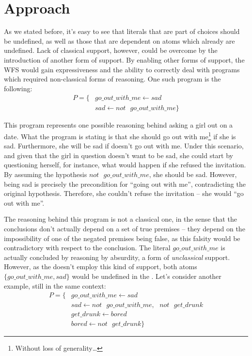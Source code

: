 \section{Approach}
As we stated before, it's easy to see that literals that are part of choices should be undefined, as well as those that are dependent on atoms which already are undefined. Lack of classical support, however, could be overcome by the introduction of another form of support. By enabling other forms of support, the WFS would gain expressiveness and the ability to correctly deal with programs which required non-classical forms of reasoning. One such program is the following:
\begin{align*}
P=\{ & go\_out\_with\_me\leftarrow sad\\
		 & sad \leftarrow not\text{ }go\_out\_with\_me\}
\end{align*}

This program represents one possible reasoning behind asking a girl out on a date. What the program is stating is that she should go out with me\footnote{Without loss of generality\ldots} if she is sad. Furthermore, she will be sad if doesn't go out with me. Under this scenario, and given that the girl in question doesn't want to be sad, she could start by questioning herself, for instance, what would happen if she refused the invitation. By assuming the hypothesis $not\text{ }go\_out\_with\_me$, she should be sad. However, being sad is precisely the precondition for ``going out with me'', contradicting the original hypothesis. Therefore, she couldn't refuse the invitation -- she would ``go out with me''.

The reasoning behind this program is not a classical one, in the sense that the conclusions don't actually depend on a set of true premises -- they depend on the impossibility of one of the negated premises being false, as this falsity would be contradictory with respect to the conclusion. The literal $go\_out\_with\_me$ is actually concluded by reasoning by absurdity, a form of \emph{unclassical} support. However, as the \wfs doesn't employ this kind of support, both atoms $\{go\_out\_with\_me, sad\}$ would be undefined in the \wfm. Let's consider another example, still in the same context:
\begin{align*}
P=\{ & go\_out\_with\_me\leftarrow sad\\
		 & sad \leftarrow not\text{ }go\_out\_with\_me,\text{ }not\text{ }get\_drunk\\
		 & get\_drunk\leftarrow bored\\
		 & bored \leftarrow not\text{ }get\_drunk\}
\end{align*}

